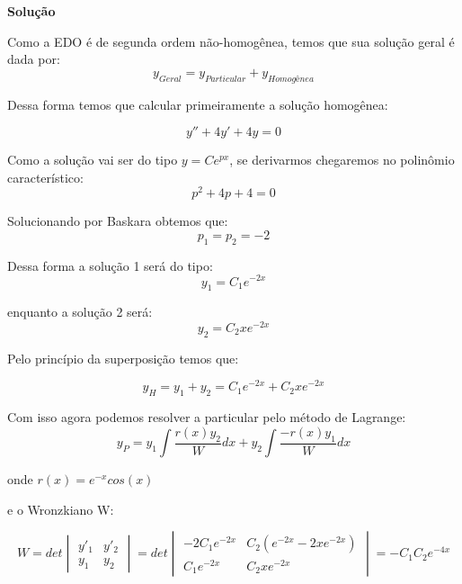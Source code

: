 \linespread{1.5}

\textbf{Solução}

Como a EDO é de segunda ordem não-homogênea, temos que sua solução geral é dada por:
\begin{equation*}
    y_{Geral} = y_{Particular} + y_{Homogênea}
\end{equation*}

Dessa forma temos que calcular primeiramente a solução homogênea:

\begin{equation*}
    y''+4y'+4y=0
\end{equation*}

Como a solução vai ser do tipo $y = Ce^{px}$, se derivarmos chegaremos no polinômio característico:
\begin{equation*}
    p^2+4p+4=0
\end{equation*}

Solucionando por Baskara obtemos que:
\begin{equation*}
    p_1 = p_2 = -2
\end{equation*}

Dessa forma a solução 1 será do tipo:
\begin{equation*}
    y_1 = C_1e^{-2x}
\end{equation*}

enquanto a solução 2 será:
\begin{equation*}
    y_2 = C_2xe^{-2x}
\end{equation*}

Pelo princípio da superposição temos que:

\begin{equation*}
    \boxed{y_H = y_1 + y_2 = C_1e^{-2x} + C_2xe^{-2x}}
\end{equation*}

Com isso agora podemos resolver a particular pelo método de Lagrange:
\begin{equation*}
    y_P = y_1\int \frac{r(x)y_2}{W}dx + y_2\int \frac{-r(x)y_1}{W} dx
\end{equation*}

onde $r(x) = e^{-x}cos(x)$

e o Wronzkiano W:

\begin{equation*}
 W = det\begin{vmatrix}
    y'_1 & y'_2\\
    y_1 & y_2
    \end{vmatrix} = 
    det\begin{vmatrix}
    -2C_1e^{-2x} & C_2(e^{-2x} - 2xe^{-2x})\\
    C_1e^{-2x} & C_2xe^{-2x}
    \end{vmatrix} = -C_1C_2e^{-4x}
\end{equation*}

